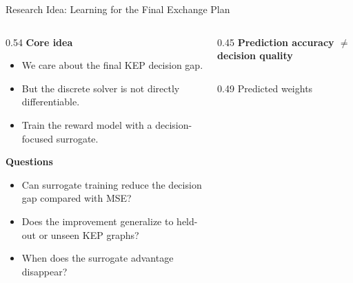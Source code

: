\documentclass[aspectratio=169]{beamer}
\begin{document}
\begin{frame}{Research Idea: Learning for the Final Exchange Plan}
  \footnotesize
  \begin{columns}[T,onlytextwidth]
    \begin{column}{0.54\textwidth}
      \textbf{Core idea}
      \begin{itemize}\setlength{\itemsep}{0.25em}
        \item We care about the final KEP decision gap.
        \item But the discrete solver is not directly differentiable.
        \item Train the reward model with a decision-focused surrogate.
      \end{itemize}

      \vspace{0.45em}
      \textbf{Questions}
      \begin{itemize}\setlength{\itemsep}{0.25em}
        \item Can surrogate training reduce the decision gap compared with MSE?
        \item Does the improvement generalize to held-out or unseen KEP graphs?
        \item When does the surrogate advantage disappear?
      \end{itemize}
    \end{column}

    \begin{column}{0.45\textwidth}
      \centering
      \textbf{Prediction accuracy \(\neq\) decision quality}

      \vspace{0.5em}
      \begin{columns}[T,totalwidth=\linewidth]
        \begin{column}{0.49\linewidth}
          \centering
          {\scriptsize Predicted weights}

          \vspace{0.2em}
        \end{column}


\end{columns}
\end{column}
\end{columns}
\end{frame}
\end{document}
